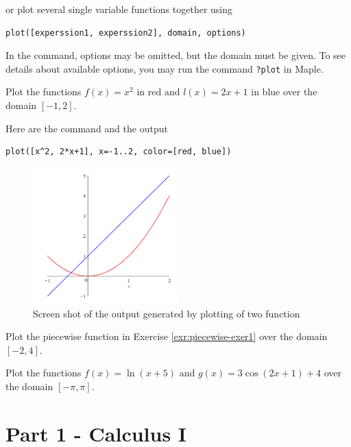 \documentclass[en,11pt,simple]{elegantbook}
\let\BeginKnitrBlock\begin \let\EndKnitrBlock\end
\begin{document}
or plot several single variable functions together using

\begin{verbatim}
plot([experssion1, experssion2], domain, options)
\end{verbatim}

In the command, options may be omitted, but the domain must be given.
To see details about available options, you may run the command \texttt{?plot} in Maple.

\BeginKnitrBlock{example}{}{}
\protect\hypertarget{exm:unnamed-chunk-7}{}{\label{exm:unnamed-chunk-7} }
Plot the functions \(f(x)=x^2\) in red and \(l(x)=2x+1\) in blue over the domain \([-1, 2]\).
\EndKnitrBlock{example}

\BeginKnitrBlock{solution}{}{}
{}
Here are the command and the output

\begin{verbatim}
plot([x^2, 2*x+1], x=-1..2, color=[red, blue])
\end{verbatim}

\begin{figure}
\centering
\includegraphics[width=0.5\textwidth,height=\textheight]{figs/First-Plot-Example.png}
\caption{Screen shot of the output generated by plotting of two function}
\end{figure}
\EndKnitrBlock{solution}

\BeginKnitrBlock{exercise}{}{}
\protect\hypertarget{exr:unnamed-chunk-9}{}{\label{exr:unnamed-chunk-9} }
Plot the piecewise function in Exercise \ref{exr:piecewise-exer1} over the domain \([-2, 4]\).
\EndKnitrBlock{exercise}

\BeginKnitrBlock{exercise}{}{}
\protect\hypertarget{exr:unnamed-chunk-10}{}{\label{exr:unnamed-chunk-10} }
Plot the functions \(f(x)=\ln(x+5)\) and \(g(x)=3\cos(2x+1)+4\) over the domain \([-\pi, \pi]\).
\EndKnitrBlock{exercise}

\hypertarget{part-part-1---calculus-i}{%
\part*{Part 1 - Calculus I}\label{part-part-1---calculus-i}}
\end{document}
